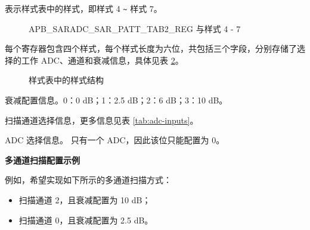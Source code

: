 \documentclass[main\_\_CN.tex]{subfiles}
\begin{document}
%
%
%
%
%
\begin{regdesc}\begin{reglist}
\item [cmd \regindex{x}] 表示样式表中的样式，即样式 4 \verb+~+ 样式 7。
\end{reglist}\end{regdesc}
\vspace{-2em}
\begin{figure}[H]
    \centering
    \caption{APB\_SARADC\_SAR\_PATT\_TAB2\_REG 与样式 4 - 7}
    \label{fig:pattern-tab-2}
\end{figure}

每个寄存器包含四个样式，每个样式长度为六位，共包括三个字段，分别存储了选择的工作 ADC、通道和衰减信息，具体见表 \ref{tab:pattern-table-register}。

\begin{figure}[H]
\centering
{}%
%
%
\end{figure}
\vspace{-2em}
\begin{figure}[H]
    \centering
    \caption{样式表中的样式结构}
    \label{tab:pattern-table-register}
\end{figure}
\vspace{-2em}
\begin{regdesc}\begin{reglist}
\item [atten] 衰减配置信息。0：0 dB；1：2.5 dB；2：6 dB；3：10 dB。
\item [ch\_sel] 扫描通道选择信息，更多信息见表 \ref{tab:adc-inputs}。
\item [sar\_sel] ADC 选择信息。\chipname{} 只有一个 ADC，因此该位只能配置为 0。
\end{reglist}\end{regdesc}

\textbf{多通道扫描配置示例}

例如，希望实现如下所示的多通道扫描方式：
\begin{itemize}
    \item 扫描通道 2，且衰减配置为 10 dB；
    \item 扫描通道 0，且衰减配置为 2.5 dB。
\end{itemize}
\end{document}

